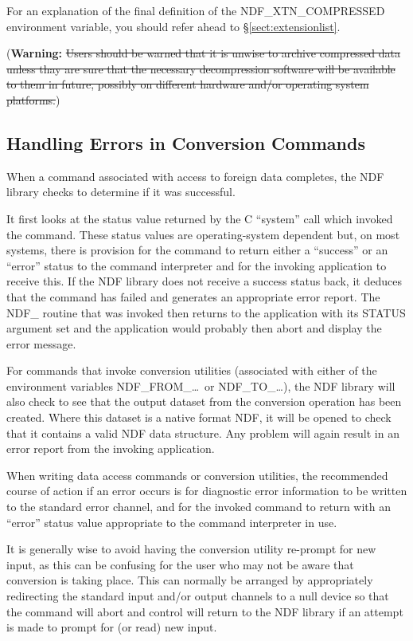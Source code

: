 For an explanation of the final definition of the NDF\_XTN\_COMPRESSED
environment variable, you should refer ahead to
\S\ref{sect:extensionlist}.

({\bf{Warning:}} \st{Users should be warned that it is unwise to
archive compressed data unless thay are sure that the necessary
decompression software will be available to them in future, possibly
on different hardware and/or operating system platforms.})

\subsection{\label{sect:errors}Handling Errors in Conversion Commands}

When a command associated with access to foreign data completes, the
NDF library checks to determine if it was successful.

It first looks at the status value returned by the C ``system'' call
which invoked the command. These status values are operating-system
dependent but, on most systems, there is provision for the command to
return either a ``success'' or an ``error'' status to the command
interpreter and for the invoking application to receive this.  If the
NDF library does not receive a success status back, it deduces that
the command has failed and generates an appropriate error report. The
NDF\_ routine that was invoked then returns to the application with
its STATUS argument set and the application would probably then abort
and display the error message.

For commands that invoke conversion utilities (associated with either
of the environment variables NDF\_FROM\_\ldots\ or NDF\_TO\_\ldots),
the NDF library will also check to see that the output dataset from
the conversion operation has been created. Where this dataset is a
native format NDF, it will be opened to check that it contains a valid
NDF data structure. Any problem will again result in an error report
from the invoking application.

When writing data access commands or conversion utilities, the
recommended course of action if an error occurs is for diagnostic
error information to be written to the standard error channel, and for
the invoked command to return with an ``error'' status value
appropriate to the command interpreter in use.

It is generally wise to avoid having the conversion utility re-prompt
for new input, as this can be confusing for the user who may not be
aware that conversion is taking place. This can normally be arranged
by appropriately redirecting the standard input and/or output channels
to a null device so that the command will abort and control will
return to the NDF library if an attempt is made to prompt for (or
read) new input.

